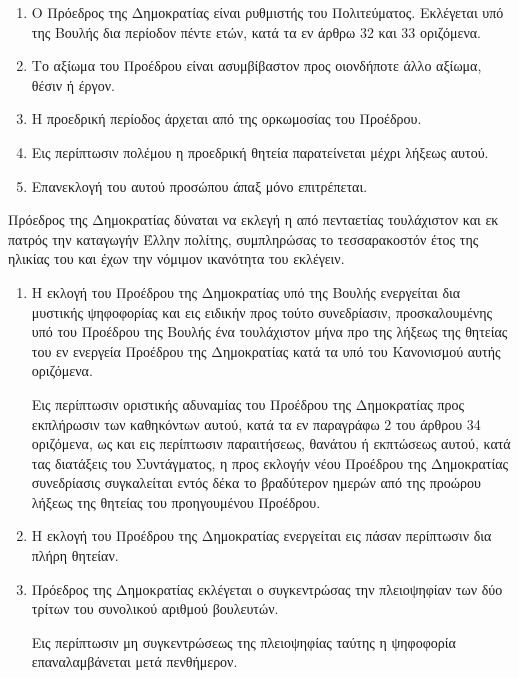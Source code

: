 \documentclass[twoside, a4paper, 10pt]{article}
\begin{document}
\begin{multicols}{2}
\begin{enumerate}
\begin{BigQuote}

\begin{enumerate}
  \item[1.] Ο Πρόεδρος της Δημοκρατίας είναι ρυθμιστής του Πολιτεύματος. Εκλέγεται υπό της Βουλής δια περίοδον πέντε ετών, κατά τα εν άρθρω 32 και 33 οριζόμενα.
  \item[2.] Το αξίωμα του Προέδρου είναι ασυμβίβαστον προς οιονδήποτε άλλο αξίωμα, θέσιν ή έργον.
  \item[3.] Η προεδρική περίοδος άρχεται από της ορκωμοσίας του Προέδρου.
  \item[4.] Εις περίπτωσιν πολέμου η προεδρική θητεία παρατείνεται μέχρι λήξεως αυτού.
  \item[5.] Επανεκλογή του αυτού προσώπου άπαξ μόνο επιτρέπεται.
\end{enumerate}

Πρόεδρος της Δημοκρατίας δύναται να εκλεγή η από πενταετίας τουλάχιστον και εκ πατρός την καταγωγήν Έλλην πολίτης, συμπληρώσας το τεσσαρακοστόν έτος της ηλικίας του και έχων την νόμιμον ικανότητα του εκλέγειν.

\begin{enumerate}
  \item[1.] Η εκλογή του Προέδρου της Δημοκρατίας υπό της Βουλής ενεργείται δια μυστικής ψηφοφορίας και εις ειδικήν προς τούτο συνεδρίασιν, προσκαλουμένης υπό του Προέδρου της Βουλής ένα τουλάχιστον μήνα προ της λήξεως της θητείας του εν ενεργεία Προέδρου της Δημοκρατίας κατά τα υπό του Κανονισμού αυτής οριζόμενα.

Εις περίπτωσιν οριστικής αδυναμίας του Προέδρου της Δημοκρατίας προς εκπλήρωσιν των καθηκόντων αυτού, κατά τα εν παραγράφω 2 του άρθρου 34 οριζόμενα, ως και εις περίπτωσιν παραιτήσεως, θανάτου ή εκπτώσεως αυτού, κατά τας διατάξεις του Συντάγματος, η προς εκλογήν νέου Προέδρου της Δημοκρατίας συνεδρίασις συγκαλείται εντός δέκα το βραδύτερον ημερών από της προώρου λήξεως της θητείας του προηγουμένου Προέδρου.
  \item[2.] Η εκλογή του Προέδρου της Δημοκρατίας ενεργείται εις πάσαν περίπτωσιν δια πλήρη θητείαν.
  \item[3.] Πρόεδρος της Δημοκρατίας εκλέγεται ο συγκεντρώσας την πλειοψηφίαν των δύο τρίτων του συνολικού αριθμού βουλευτών.

Εις περίπτωσιν μη συγκεντρώσεως της πλειοψηφίας ταύτης η ψηφοφορία επαναλαμβάνεται μετά πενθήμερον.


\end{enumerate}
\end{BigQuote}
\end{enumerate}
\end{multicols}
\end{document}
